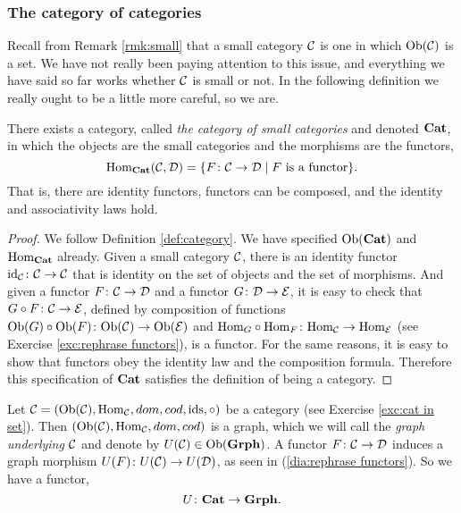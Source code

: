 
\subsubsection{The category of categories}\label{sec:cat of cats}

Recall from Remark \ref{rmk:small} that a small category $\mathcal{C}$ is one in which $\textnormal{Ob}(\mathcal{C})$ is a set. We have not really been paying attention to this issue, and everything we have said so far works whether $\mathcal{C}$ is small or not. In the following definition we really ought to be a little more careful, so we are. 

\begin{proposition}

There exists a category, called {\em the category of small categories} and denoted ${\bf Cat}$, in which the objects are the small categories and the morphisms are the functors, $$\textnormal{Hom}_{\bf Cat}(\mathcal{C},\mathcal{D})=\{F\colon\mathcal{C}\rightarrow\mathcal{D}{\;|\;} F \textnormal{ is a functor}\}.$$ That is, there are identity functors, functors can be composed, and the identity and associativity laws hold.
 
\end{proposition}

\begin{proof}

We follow Definition \ref{def:category}. We have specified $\textnormal{Ob}({\bf Cat})$ and $\textnormal{Hom}_{\bf Cat}$ already. Given a small category $\mathcal{C}$, there is an identity functor $\textnormal{id}_\mathcal{C}\colon\mathcal{C}\rightarrow\mathcal{C}$ that is identity on the set of objects and the set of morphisms. And given a functor $F\colon\mathcal{C}\rightarrow\mathcal{D}$ and a functor $G\colon\mathcal{D}\rightarrow\mathcal{E}$, it is easy to check that $G\circ F\colon \mathcal{C}\rightarrow\mathcal{E}$, defined by composition of functions $\textnormal{Ob}(G)\circ\textnormal{Ob}(F)\colon\textnormal{Ob}(\mathcal{C})\rightarrow\textnormal{Ob}(\mathcal{E})$ and $\textnormal{Hom}_G\circ\textnormal{Hom}_F\colon\textnormal{Hom}_\mathcal{C}\rightarrow\textnormal{Hom}_\mathcal{E}$ (see Exercise \ref{exc:rephrase functors}), is a functor. For the same reasons, it is easy to show that functors obey the identity law and the composition formula. Therefore this specification of ${\bf Cat}$ satisfies the definition of being a category. 

\end{proof}

\begin{example}\label{ex:underlying graph}

Let $\mathcal{C}=(\textnormal{Ob}(\mathcal{C}),\textnormal{Hom}_\mathcal{C},dom,cod,\textnormal{ids},\circ)$ be a category (see Exercise \ref{exc:cat in set}). Then $(\textnormal{Ob}(\mathcal{C}),\textnormal{Hom}_\mathcal{C},dom,cod)$ is a graph, which we will call the {\em graph underlying $\mathcal{C}$} and denote by $U(\mathcal{C})\in\textnormal{Ob}({\bf Grph})$. A functor $F\colon\mathcal{C}\rightarrow\mathcal{D}$ induces a graph morphism $U(F)\colon U(\mathcal{C})\rightarrow U(\mathcal{D})$, as seen in (\ref{dia:rephrase functors}). So we have a functor, $$U\colon{\bf Cat}\rightarrow{\bf Grph}.$$

\end{example}

